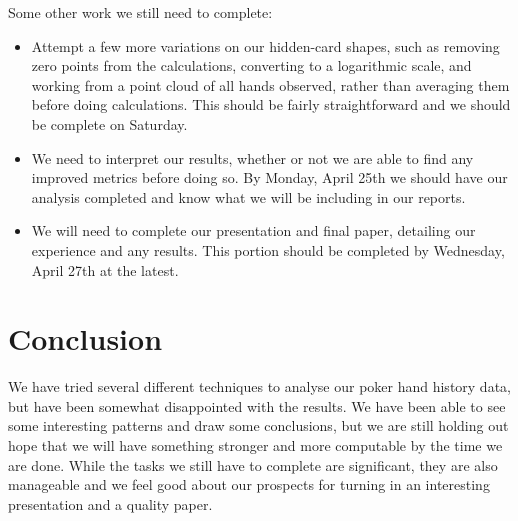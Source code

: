 \documentclass[11pt]{article}
\begin{document}
Some other work we still need to complete:

\begin{itemize}[noitemsep]
	\item Attempt a few more variations on our hidden-card shapes, such as
	removing zero points from the calculations, converting to a logarithmic
	scale, and working from a point cloud of all hands observed, rather than
	averaging them before doing calculations. This should be fairly straightforward
	and we should be complete on Saturday.
	\item We need to interpret our results, whether or not we are able to find
	any improved metrics before doing so. By Monday, April 25th we should have
	our analysis completed and know what we will be including in our reports.
	\item We will need to complete our presentation and final paper, detailing
	our experience and any results. This portion should be completed by Wednesday,
	April 27th at the latest.
\end{itemize}

\section*{Conclusion}
We have tried several different techniques to analyse our poker hand history data,
but have been somewhat disappointed with the results. We have been able to see
some interesting patterns and draw some conclusions, but we are still holding out
hope that we will have something stronger and more computable by the time we are 
done. While the tasks we still have to complete are significant, they are also
manageable and we feel good about our prospects for turning in an interesting
presentation and a quality paper.
\end{document}
